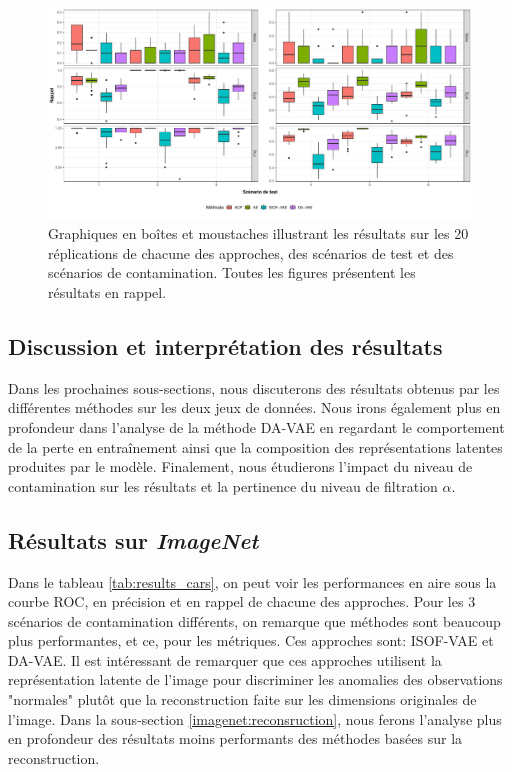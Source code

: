 \begin{figure}[H]
	\centering
	\includegraphics[width=\linewidth]{images/images_boxplots/recall_mnist.pdf}
	\caption{Graphiques en boîtes et moustaches illustrant les résultats sur les 20 réplications de chacune des approches, des scénarios de test et des scénarios de contamination. Toutes les figures présentent les résultats en rappel.}
	\label{fig:recall_mnist}
\end{figure}

\subsection{Discussion et interprétation des résultats} \label{discussion}

Dans les prochaines sous-sections, nous discuterons des résultats obtenus par les différentes méthodes sur les deux jeux de données. Nous irons également plus en profondeur dans l'analyse de la méthode DA-VAE en regardant le comportement de la perte en entraînement ainsi que la composition des représentations latentes produites par le modèle. Finalement, nous étudierons l'impact du niveau de contamination sur les résultats et la pertinence du niveau de filtration $\alpha$.

\subsection{Résultats sur \textit{ImageNet}} \label{imagenet_results}

Dans le tableau \ref{tab:results_cars}, on peut voir les performances en aire sous la courbe ROC, en précision et en rappel de chacune des approches. Pour les 3 scénarios de contamination différents, on remarque que \DIFdelbegin {}\DIFdelend \DIFaddbegin {}\DIFaddend méthodes sont beaucoup plus performantes, et ce, pour les \DIFdelbegin {}\DIFdelend \DIFaddbegin {}\DIFaddend métriques. Ces \DIFdelbegin {}\DIFdelend \DIFaddbegin {}\DIFaddend approches sont: ISOF-VAE et DA-VAE. Il est intéressant de remarquer que ces \DIFdelbegin {}\DIFdelend \DIFaddbegin {}\DIFaddend approches utilisent la représentation latente de l'image pour discriminer les anomalies des observations "normales" plutôt que la reconstruction faite sur les dimensions originales de l'image. Dans la sous-section \ref{imagenet:reconsruction}, nous ferons l'analyse plus en profondeur des résultats moins performants des méthodes basées sur la reconstruction.


